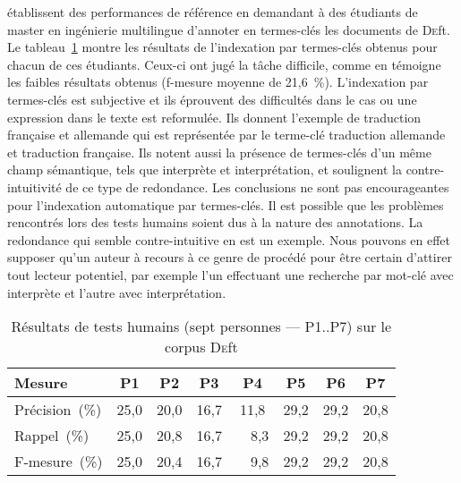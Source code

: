      établissent des performances de référence en
    demandant à des étudiants de master en ingénierie multilingue d'annoter en
    termes-clés les documents de \textsc{De}ft. Le
    tableau~\ref{tab:deft_human_tests} montre les résultats de l'indexation par
    termes-clés obtenus pour chacun de ces étudiants. Ceux-ci ont jugé la tâche
    difficile, comme en témoigne les faibles résultats obtenus (f-mesure moyenne
    de 21,6~\%). L'indexation par termes-clés est subjective et ils éprouvent des
    difficultés dans le cas ou une expression dans le texte est reformulée. Ils
    donnent l'exemple de \og{}traduction française et allemande\fg{} qui est
    représentée par le terme-clé \og{}traduction allemande et traduction
    française\fg{}. Ils notent aussi la présence de termes-clés d'un même champ
    sémantique, tels que \og{}interprète\fg{} et \og{}interprétation\fg{}, et
    soulignent la contre-intuitivité de ce type de redondance. Les conclusions ne
    sont pas encourageantes pour l'indexation automatique par termes-clés. Il
    est possible que les problèmes rencontrés lors des tests humains soient dus
    à la nature des annotations. La redondance qui semble contre-intuitive en
    est un exemple. Nous pouvons en effet supposer qu'un auteur à recours à ce
    genre de procédé pour être certain d'attirer tout lecteur potentiel, par
    exemple l'un effectuant une recherche par mot-clé avec \og{}interprète\fg{}
    et l'autre avec \og{}interprétation\fg{}.
    \begin{table}[!h]
      \centering
      \begin{tabular}{l|ccccccc}
        \toprule
          \textbf{Mesure} & \textbf{P1} & \textbf{P2} & \textbf{P3} & \textbf{P4} & \textbf{P5} & \textbf{P6} & \textbf{P7}\\
        \hline
        Précision~\hfill(\%) & 25,0 & 20,0 & 16,7 & 11,8 & 29,2 & 29,2 & 20,8\\
        Rappel~\hfill(\%) & 25,0 & 20,8 & 16,7 & ~~8,3 & 29,2 & 29,2 & 20,8\\
        F-mesure~\hfill(\%) & 25,0 & 20,4 & 16,7 & ~~9,8 & 29,2 & 29,2 & 20,8\\
        \bottomrule
      \end{tabular}
      \caption[Résultats de tests humains sur le corpus \textsc{De}ft]{
        Résultats de tests humains (sept personnes --- P1$..$P7) sur le corpus
        \textsc{De}ft
        \label{tab:deft_human_tests}
      }
    \end{table}

